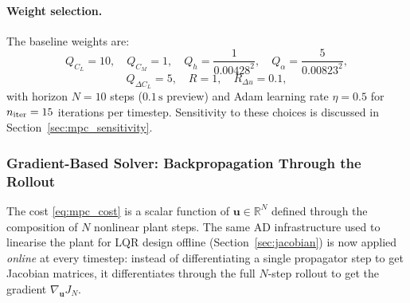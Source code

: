 \paragraph{Weight selection.}
The baseline weights are:
\begin{equation}
  Q_{C_L} = 10, \quad
  Q_{C_M} = 1, \quad
  Q_h = \frac{1}{0.00428^2}, \quad
  Q_\alpha = \frac{5}{0.00823^2},
  \label{eq:mpc_weights_state}
\end{equation}
\begin{equation}
  Q_{\Delta C_L} = 5, \quad
  R = 1, \quad
  R_{\Delta u} = 0.1,
  \label{eq:mpc_weights_ctrl}
\end{equation}
with horizon $N = 10$ steps ($0.1\,\text{s}$ preview) and Adam learning rate
$\eta = 0.5$ for $n_{\rm iter} = 15$ iterations per timestep.
Sensitivity to these choices is discussed in Section~\ref{sec:mpc_sensitivity}.

\subsubsection{Gradient-Based Solver: Backpropagation Through the Rollout}
\label{sec:mpc_solver}

The cost \eqref{eq:mpc_cost} is a scalar function of $\mathbf{u} \in \mathbb{R}^N$
defined through the composition of $N$ nonlinear plant steps.
The same AD infrastructure used to linearise the plant for LQR design offline
(Section~\ref{sec:jacobian}) is now applied \emph{online} at every timestep:
instead of differentiating a single propagator step to get Jacobian matrices,
it differentiates through the full $N$-step rollout to get the gradient
$\nabla_{\mathbf{u}} J_N$.

